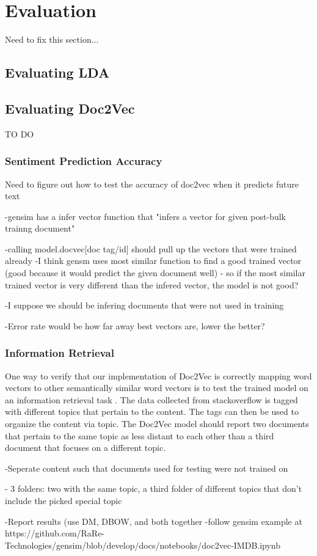 
\section{Evaluation}
Need to fix this section...

\subsection{Evaluating LDA}

\subsection{Evaluating Doc2Vec}
TO DO

\subsubsection{Sentiment Prediction Accuracy}
Need to figure out how to test the accuracy of doc2vec when it predicts future text

-gensim has a infer vector function that "infers a vector for given post-bulk trainng document"

-calling model.docvec[doc tag/id] should pull up the vectors that were trained already
	-I think gensm uses most similar function to find a good trained vector (good because it would predict the given document well)
	- so if the most similar trained vector is very different than the infered vector, the model is not good?

-I suppose we should be infering documents that were not used in training

-Error rate would be how far away best vectors are, lower the better?

\subsubsection{Information Retrieval}

One way to verify that our implementation of Doc2Vec is correctly mapping word vectors to other semantically similar word vectors is to test the trained model on an information retrieval task . \cite{RefWorks:doc:5a6e5746e4b0d609eec798d7} The data collected from stackoverflow is tagged with different topics that pertain to the content. The tags can then be used to organize the content via topic. The Doc2Vec model should report two documents that pertain to the same topic as less distant to each other than a third document that focuses on a different topic.

-Seperate content such that documents used for testing were not trained on

- 3 folders: two with the same topic, a third folder of different topics that don't include the picked special topic

-Report results (use DM, DBOW, and both together -follow gensim example at https://github.com/RaRe-Technologies/gensim/blob/develop/docs/notebooks/doc2vec-IMDB.ipynb 

